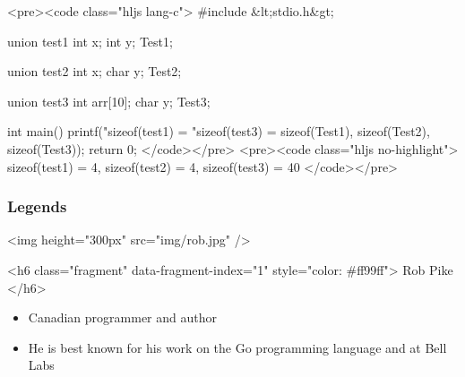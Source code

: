 \documentclass{../c-lecture}
\begin{document}
\begin{frame}
  <pre><code class="hljs lang-c">
#include &lt;stdio.h&gt;

union test1 {
    int x;
    int y;
} Test1;

union test2 {
    int x;
    char y;
} Test2;

union test3 {
    int arr[10];
    char y;
} Test3;

int main()
{
    printf("sizeof(test1) = %
           "sizeof(test3) = %
           sizeof(Test1),
           sizeof(Test2), sizeof(Test3));
    return 0;
}
  </code></pre>
  <pre><code class="hljs no-highlight">
sizeof(test1) = 4, sizeof(test2) = 4, sizeof(test3) = 40
  </code></pre>
\end{frame}
\begin{frame}
  \begin{frame}
    \frametitle{Legends}
    <img height="300px" src="img/rob.jpg" />
  \end{frame}
  \begin{frame}
    <h6 class="fragment" data-fragment-index="1" style="color: #ff99ff">
      Rob Pike
    </h6>
    \begin{itemize}
      \item Canadian programmer and author
      \item
        He is best known for his work on the Go programming language and at Bell
        Labs
    \end{itemize}
  \end{frame}
\end{frame}
\end{document}
